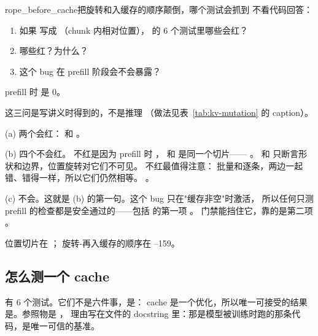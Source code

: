 \begin{checkpoint}{rope_before_cache}{把旋转和入缓存的顺序颠倒，哪个测试会抓到}
不看代码回答：
\begin{enumerate}[label=(\alph*)]
  \item 如果  写成 （chunk 内相对位置），
         的 6 个测试里哪些会红？
  \item 哪些红？为什么？
  \item 这个 bug 在 prefill 阶段会不会暴露？
\end{enumerate}
\hint prefill 时  是 0。

\ifshowanswers
\tcblower
\answer 这三问是写讲义时得到的，不是推理
（做法见表~\ref{tab:kv-mutation} 的 caption）。

(a) 两个会红： 和
。

(b) 四个不会红。 不红是因为 prefill 时
， 和  是同一个切片——
。
 和
 只断言形状和边界，位置旋转对它们不可见。
 不红最值得注意：
批量和逐条，两边一起错、错得一样，所以它们仍然相等。
。

(c) 不会。这就是 (b) 的第一句。这个 bug 只在"缓存非空"时激活，
所以任何只测 prefill 的检查都是安全通过的——包括
 的第一项 。
门禁能挡住它，靠的是第二项 。

\whereincode 位置切片在 ；
旋转-再入缓存的顺序在 --159。
\fi
\end{checkpoint}

\subsection{怎么测一个 cache}
\label{sec:b-kv-tests}

 有 6 个测试。它们不是六件事，是：
cache 是一个优化，所以唯一可接受的结果是。参照物是 ，
理由写在文件的 docstring 里：那是模型被训练时跑的那条代码，是唯一可信的基准。

